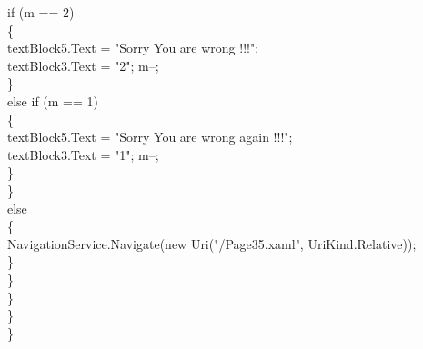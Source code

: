 {{                    if (m == 2)\\
                    \{\\
                        textBlock5.Text = "Sorry You are wrong !!!";\\
                        textBlock3.Text = "2"; m--;\\
                    \}\\
                    else if (m == 1)\\
                    \{\\
                        textBlock5.Text = "Sorry You are wrong again !!!";\\
                        textBlock3.Text = "1"; m--;\\
                    \}\\
                \}\\
                else\\
                \{\\
                    NavigationService.Navigate(new Uri("/Page35.xaml", UriKind.Relative));\\
                \}\\
            \}\\
        \}\\
    \}\\
\}\\


}}
